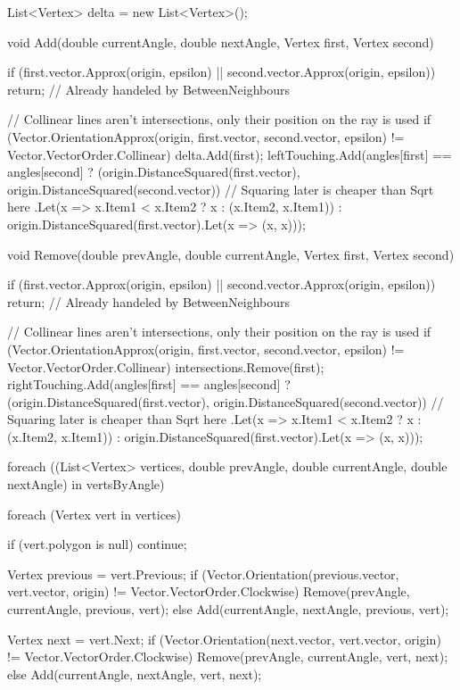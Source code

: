 \documentclass[12pt]{article}
\begin{document}
\begin{Csharp}[caption=class Map]
\begin{Csharp}
{    List<Vertex> delta = new List<Vertex>();

    void Add(double currentAngle, double nextAngle, Vertex first, Vertex second)
    {
        if (first.vector.Approx(origin, epsilon) || second.vector.Approx(origin, epsilon)) return; // Already handeled by BetweenNeighbours

        // Collinear lines aren't intersections, only their position on the ray is used
        if (Vector.OrientationApprox(origin, first.vector, second.vector, epsilon) != Vector.VectorOrder.Collinear) delta.Add(first);
        leftTouching.Add(angles[first] == angles[second]
                ? (origin.DistanceSquared(first.vector), origin.DistanceSquared(second.vector)) // Squaring later is cheaper than Sqrt here
                    .Let(x => x.Item1 < x.Item2 ? x : (x.Item2, x.Item1))
                : origin.DistanceSquared(first.vector).Let(x => (x, x)));
    }
    void Remove(double prevAngle, double currentAngle, Vertex first, Vertex second)
    {
        if (first.vector.Approx(origin, epsilon) || second.vector.Approx(origin, epsilon)) return; // Already handeled by BetweenNeighbours

        // Collinear lines aren't intersections, only their position on the ray is used
        if (Vector.OrientationApprox(origin, first.vector, second.vector, epsilon) != Vector.VectorOrder.Collinear) intersections.Remove(first);
        rightTouching.Add(angles[first] == angles[second]
                ? (origin.DistanceSquared(first.vector), origin.DistanceSquared(second.vector)) // Squaring later is cheaper than Sqrt here
                    .Let(x => x.Item1 < x.Item2 ? x : (x.Item2, x.Item1))
                : origin.DistanceSquared(first.vector).Let(x => (x, x)));
    }

    foreach ((List<Vertex> vertices, double prevAngle, double currentAngle, double nextAngle) in vertsByAngle)
    {
        foreach (Vertex vert in vertices)
        {
            if (vert.polygon is null) continue;

            Vertex previous = vert.Previous;
            if (Vector.Orientation(previous.vector, vert.vector, origin) != Vector.VectorOrder.Clockwise) Remove(prevAngle, currentAngle, previous, vert);
            else Add(currentAngle, nextAngle, previous, vert);

            Vertex next = vert.Next;
            if (Vector.Orientation(next.vector, vert.vector, origin) != Vector.VectorOrder.Clockwise) Remove(prevAngle, currentAngle, vert, next);
            else Add(currentAngle, nextAngle, vert, next);
        }

}}
\end{Csharp}
\end{Csharp}
\end{document}
